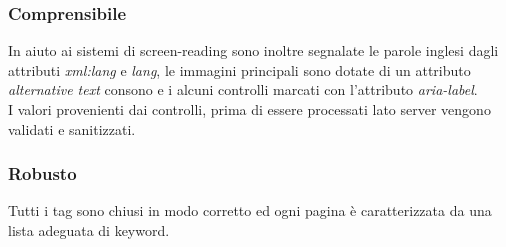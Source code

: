 \subsubsection{Comprensibile}
In aiuto ai sistemi di screen-reading sono inoltre segnalate le parole inglesi dagli attributi \textit{xml:lang} e \textit{lang}, le immagini principali sono dotate di un attributo \textit{alternative text} consono e i alcuni controlli marcati con l'attributo \textit{aria-label}.\\
I valori provenienti dai controlli, prima di essere processati lato server vengono validati e sanitizzati.
\subsubsection{Robusto}
Tutti i tag sono chiusi in modo corretto ed ogni pagina è caratterizzata da una lista adeguata di keyword.
\newpage

